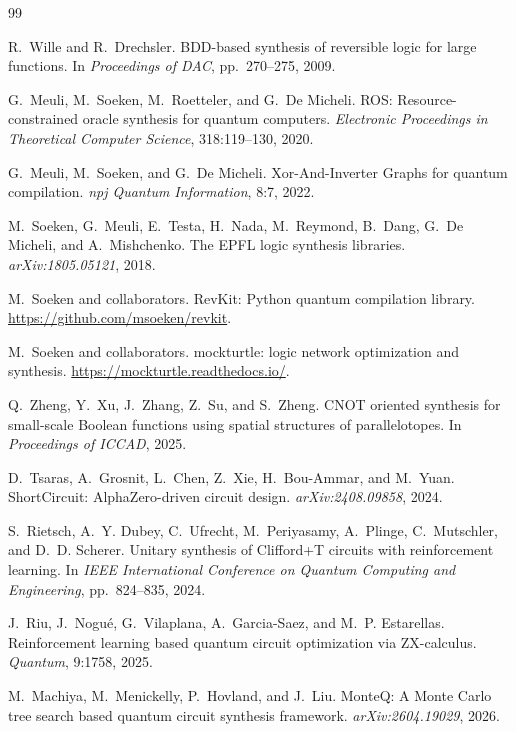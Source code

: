 \documentclass[UTF8,fontset=macnew,11pt]{ctexart}
\begin{document}
\begin{thebibliography}{99}

R.~Wille and R.~Drechsler.
\newblock BDD-based synthesis of reversible logic for large functions.
\newblock In \emph{Proceedings of DAC}, pp.~270--275, 2009.

G.~Meuli, M.~Soeken, M.~Roetteler, and G.~De Micheli.
\newblock ROS: Resource-constrained oracle synthesis for quantum computers.
\newblock \emph{Electronic Proceedings in Theoretical Computer Science}, 318:119--130, 2020.

G.~Meuli, M.~Soeken, and G.~De Micheli.
\newblock Xor-And-Inverter Graphs for quantum compilation.
\newblock \emph{npj Quantum Information}, 8:7, 2022.

M.~Soeken, G.~Meuli, E.~Testa, H.~Nada, M.~Reymond, B.~Dang, G.~De Micheli, and A.~Mishchenko.
\newblock The EPFL logic synthesis libraries.
\newblock \emph{arXiv:1805.05121}, 2018.

M.~Soeken and collaborators.
\newblock RevKit: Python quantum compilation library.
\newblock \url{https://github.com/msoeken/revkit}.

M.~Soeken and collaborators.
\newblock mockturtle: logic network optimization and synthesis.
\newblock \url{https://mockturtle.readthedocs.io/}.

Q.~Zheng, Y.~Xu, J.~Zhang, Z.~Su, and S.~Zheng.
\newblock CNOT oriented synthesis for small-scale Boolean functions using spatial structures of parallelotopes.
\newblock In \emph{Proceedings of ICCAD}, 2025.

D.~Tsaras, A.~Grosnit, L.~Chen, Z.~Xie, H.~Bou-Ammar, and M.~Yuan.
\newblock ShortCircuit: AlphaZero-driven circuit design.
\newblock \emph{arXiv:2408.09858}, 2024.

S.~Rietsch, A.~Y. Dubey, C.~Ufrecht, M.~Periyasamy, A.~Plinge, C.~Mutschler, and D.~D. Scherer.
\newblock Unitary synthesis of Clifford+T circuits with reinforcement learning.
\newblock In \emph{IEEE International Conference on Quantum Computing and Engineering}, pp.~824--835, 2024.

J.~Riu, J.~Nogu{\'e}, G.~Vilaplana, A.~Garcia-Saez, and M.~P. Estarellas.
\newblock Reinforcement learning based quantum circuit optimization via ZX-calculus.
\newblock \emph{Quantum}, 9:1758, 2025.

M.~Machiya, M.~Menickelly, P.~Hovland, and J.~Liu.
\newblock MonteQ: A Monte Carlo tree search based quantum circuit synthesis framework.
\newblock \emph{arXiv:2604.19029}, 2026.

\end{thebibliography}
\end{document}
